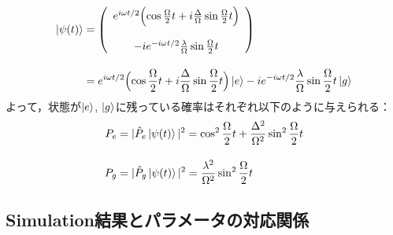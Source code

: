 \begin{align}
     \ket{\psi(t)}&=\left(
        \begin{array}{c}
       e^{i\omega t/2}
       \Bigl(
       \cos{\frac{\Omega }{2}t}
       +i\frac{\Delta}{\Omega}
       \sin{\frac{\Omega}{2}t}
       \Bigr)\\[15pt]
       -ie^{-i\omega t/2}
       \frac{\lambda}{\Omega}
       \sin{\frac{\Omega}{2}t}\\
        \end{array}
        \right)\\[10pt]
        &=e^{i\omega t/2}
       \Bigl(
       \cos{\frac{\Omega }{2}t}
       +i\frac{\Delta}{\Omega}
       \sin{\frac{\Omega}{2}t}
       \Bigr)
       \ket{e}
       -ie^{-i\omega t/2}
       \frac{\lambda}{\Omega}
       \sin{\frac{\Omega}{2}t}\ket{g}
\end{align}
よって，状態が$\ket{e}$, $\ket{g}$に残っている確率はそれぞれ以下のように与えられる：
\begin{align}
    P_e &= |\hat{P}_e\ket{\psi(t)}|^2
    =  \cos^2{\frac{\Omega }{2}t}
       +\frac{\Delta^2}{\Omega^2}
       \sin^2{\frac{\Omega}{2}t}\\[10pt]
    P_g &= |\hat{P}_g\ket{\psi(t)}|^2
    = \frac{\lambda^2}{\Omega^2}
       \sin^2{\frac{\Omega}{2}t}
\end{align}



\subsection{Simulation結果とパラメータの対応関係}
